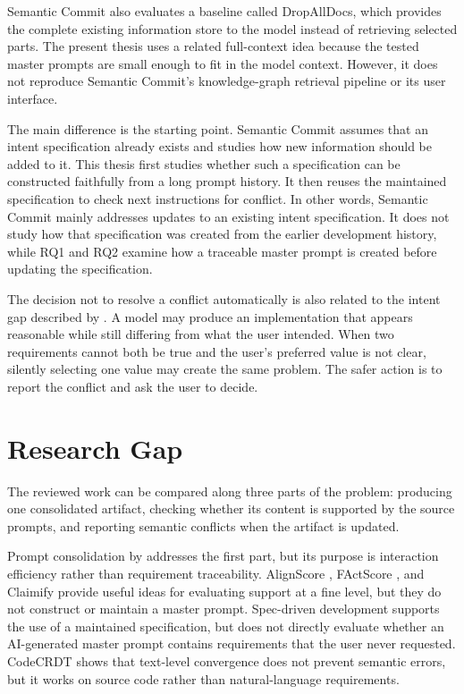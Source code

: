 Semantic Commit also evaluates a baseline called DropAllDocs, which provides
the complete existing information store to the model instead of retrieving
selected parts. The present thesis uses a related full-context idea because
the tested master prompts are small enough to fit in the model context.
However, it does not reproduce Semantic Commit's knowledge-graph retrieval
pipeline or its user interface.

The main difference is the starting point. Semantic Commit assumes that an
intent specification already exists and studies how new information should be
added to it. This thesis first studies whether such a specification can be
constructed faithfully from a long prompt history. It then reuses the
maintained specification to check next instructions for conflict. In other
words, Semantic Commit mainly addresses updates to an existing intent
specification. It does not study how that specification was created from
the earlier development history, while RQ1 and RQ2 examine how a traceable master prompt is
created before updating the specification.

The decision not to resolve a conflict automatically is also related to the
intent gap described by \citet{lahiri2026intent}. A model may produce an
implementation that appears reasonable while still differing from what the
user intended. When two requirements cannot both be true and the user's
preferred value is not clear, silently selecting one value may create the
same problem. The safer action is to report the conflict and ask the user to
decide.

\section{Research Gap}
\label{sec:positioning}

The reviewed work can be compared along three parts of the problem: producing
one consolidated artifact, checking whether its content is supported by the
source prompts, and reporting semantic conflicts when the artifact is updated.

Prompt consolidation by \citet{mondal2024consolidating} addresses the first
part, but its purpose is interaction efficiency rather than requirement
traceability. AlignScore \citep{zha2023alignscore}, FActScore
\citep{min2023factscore}, and Claimify \citep{metropolitansky2025claimify}
provide useful ideas for evaluating support at a fine level, but they do not
construct or maintain a master prompt. Spec-driven development
\citep{piskala2026specdriven} supports the use of a maintained specification,
but does not directly evaluate whether an AI-generated master prompt contains
requirements that the user never requested. CodeCRDT
\citep{pugachev2025codecrdt} shows that text-level convergence does not
prevent semantic errors, but it works on source code rather than
natural-language requirements.

